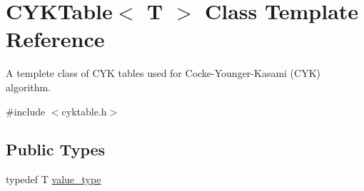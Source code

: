 \hypertarget{class_c_y_k_table}{\section{C\+Y\+K\+Table$<$ T $>$ Class Template Reference}
\label{class_c_y_k_table}
}


A templete class of C\+Y\+K tables used for Cocke-\/\+Younger-\/\+Kasami (C\+Y\+K) algorithm.  




{\ttfamily \#include $<$cyktable.\+h$>$}

\subsection*{Public Types}
\begin{DoxyCompactItemize}
\item 
typedef T \hyperlink{class_c_y_k_table_af0e11c1238d77d508d04eca433b25393}{value\+\_\+type}
\end{DoxyCompactItemize}
